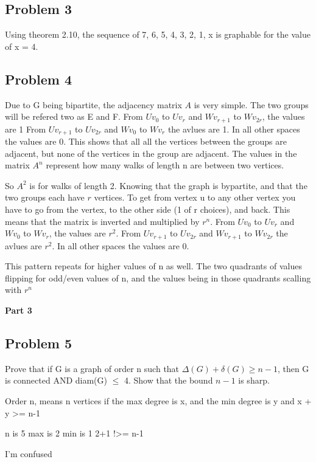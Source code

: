 \documentclass[10pt,a4paper]{article}
\begin{document}
\subsection*{Problem 3}

Using theorem 2.10, the sequence of 7, 6, 5, 4, 3, 2, 1, x is graphable for the value of x = 4.

\subsection*{Problem 4}

Due to G being bipartite, the adjacency matrix $A$ is very simple. The two groups will be refered two as E and F.
From $Uv_0$ to $Uv_r$ and $Wv_{r+1}$ to $Wv_{2r}$, the values are 1
From $Uv_{r+1}$ to $Uv_{2r}$ and $Wv_0$ to $Wv_r$ the avlues are 1.
In all other spaces the values are 0.
This shows that all all the vertices between the groups are adjacent, but none of the vertices in the group are adjacent.
The values in the matrix $A^n$ represent how many walks of length n are between two vertices.

So $A^2$ is for walks of length 2. Knowing that the graph is bypartite, and that the two groups each
have $r$ vertices. To get from vertex u to any other vertex you have to go from the vertex, to the other side (1 of r choices), and back.
This means that the matrix is inverted and multiplied by $r^n$.
From $Uv_0$ to $Uv_r$ and $Wv_0$ to $Wv_r$, the values are $r^2$.
From $Uv_{r+1}$ to $Uv_{2r}$ and $Wv_{r+1}$ to $Wv_{2r}$ the avlues are $r^2$.
In all other spaces the values are 0.

This pattern repeats for higher values of n as well. The two quadrants of values flipping for odd/even values of n, and the values being in those quadrants scalling with $r^n$

\begin{center}
    {\bf \large Part 3}
    \end{center}

\subsection*{Problem 5}

Prove that if G is a graph of order n such that $\Delta(G) + \delta(G) \geq n - 1$, then G
is connected AND diam(G) $\leq$ 4. Show that the bound $n - 1$ is sharp.

Order n, means n vertices
if the max degree is x, and the min degree is y
and x + y >= n-1

n is 5
max is 2
min is 1
2+1 !>= n-1

I'm confused
\end{document}

